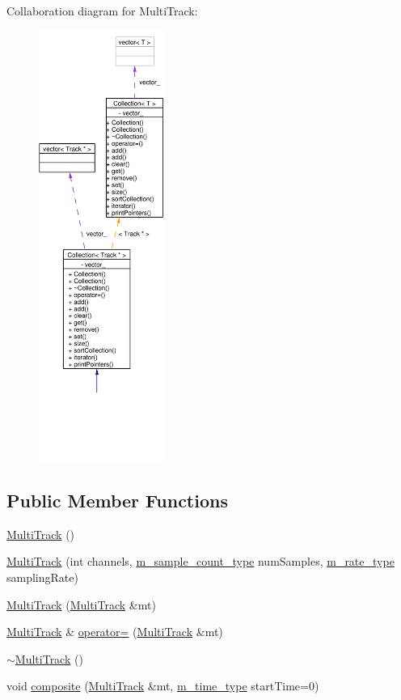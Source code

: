 Collaboration diagram for Multi\-Track:\begin{figure}[H]
\begin{center}
\leavevmode
\includegraphics[width=117pt]{classMultiTrack__coll__graph}
\end{center}
\end{figure}
\subsection*{Public Member Functions}
\begin{CompactItemize}
\item 
\hyperlink{classMultiTrack_a0}{Multi\-Track} ()
\item 
\hyperlink{classMultiTrack_a1}{Multi\-Track} (int channels, \hyperlink{Types_8h_a1}{m\_\-sample\_\-count\_\-type} num\-Samples, \hyperlink{Types_8h_a4}{m\_\-rate\_\-type} sampling\-Rate)
\item 
\hyperlink{classMultiTrack_a2}{Multi\-Track} (\hyperlink{classMultiTrack}{Multi\-Track} \&mt)
\item 
\hyperlink{classMultiTrack}{Multi\-Track} \& \hyperlink{classMultiTrack_a3}{operator=} (\hyperlink{classMultiTrack}{Multi\-Track} \&mt)
\item 
\hyperlink{classMultiTrack_a4}{$\sim$Multi\-Track} ()
\item 
void \hyperlink{classMultiTrack_a5}{composite} (\hyperlink{classMultiTrack}{Multi\-Track} \&mt, \hyperlink{Types_8h_a2}{m\_\-time\_\-type} start\-Time=0)
\end{CompactItemize}


